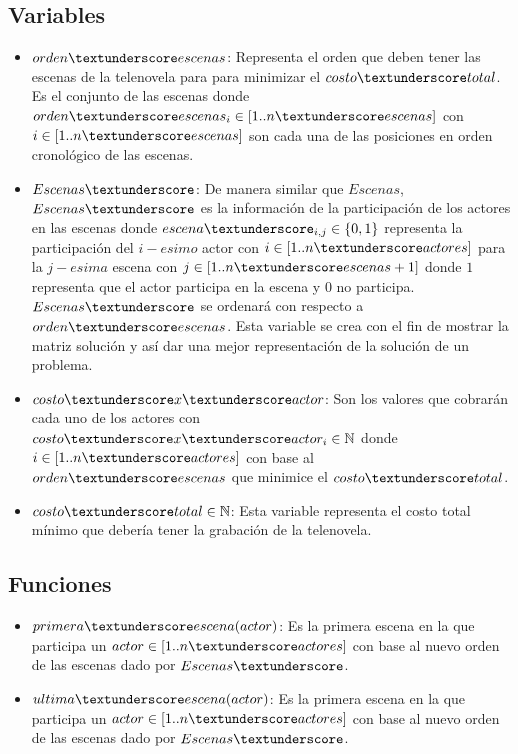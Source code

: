 \documentclass{article}
\begin{document}
\subsection{Variables}
\begin{itemize}
    \item $orden\textunderscore escenas$: Representa el orden que deben tener las escenas de la telenovela para para minimizar el $costo\textunderscore total$. Es el conjunto de las escenas donde $orden\textunderscore escenas_i \in [1..n\textunderscore escenas]$ con $i \in [1..n\textunderscore escenas]$ son cada una de las posiciones en orden cronológico de las escenas.
    \item $Escenas\textunderscore$: De manera similar que $Escenas$, $Escenas\textunderscore$ es la información de la participación de los actores en las escenas donde $escena\textunderscore_{i,j} \in \{0,1\}$ representa la participación del $i-esimo$ actor con $i \in [1..n\textunderscore actores]$ para la $j-esima$ escena con $j \in [1..n\textunderscore escenas + 1]$ donde  $1$ representa que el actor participa en la escena y $0$ no participa. $Escenas\textunderscore$ se ordenará con respecto a $orden\textunderscore escenas$. Esta variable se crea con el fin de mostrar la matriz solución y así dar una mejor representación de la solución de un problema.
    \item $costo\textunderscore x\textunderscore actor$: Son los valores que cobrarán cada uno de los actores con $costo\textunderscore x\textunderscore actor_i \in \mathbb{N}$ donde $ i \in [1..n\textunderscore actores]$ con base al $orden\textunderscore escenas$ que minimice el $costo\textunderscore total$.
    \item $costo\textunderscore total \in \mathbb{N}$: Esta variable representa el costo total mínimo que debería tener la grabación de la telenovela.
\end{itemize}

\subsection{Funciones}
\begin{itemize}
    \item $primera\textunderscore escena(actor)$: Es la primera escena en la que participa un $actor \in [1..n\textunderscore actores]$ con base al nuevo orden de las escenas dado por $Escenas\textunderscore$.
    \item $ultima\textunderscore escena(actor)$: Es la primera escena en la que participa un $actor \in [1..n\textunderscore actores]$ con base al nuevo orden de las escenas dado por $Escenas\textunderscore$.
\end{itemize}
\end{document}
